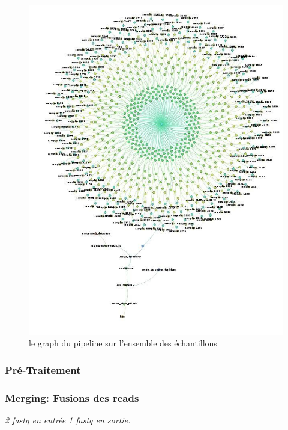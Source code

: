 \documentclass[12pt,a4paper]{article}
\begin{document}
\begin{figure}[ht]
\begin{center}
\includegraphics[scale=0.4]{img/dag.jpg}\hfill
\end{center}
\caption{le graph du pipeline sur l'ensemble des échantillons}
\label{dag}
\end{figure}

\subsubsection{Pré-Traitement}
\subsubsection{Merging: Fusions des reads}\begin{center}\emph{ 2 fastq en entrée 1 fastq en sortie. } \end{center}
\end{document}
